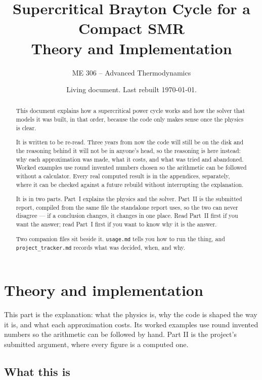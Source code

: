 \documentclass[11pt,a4paper]{report}
\title{\vspace{-1.5cm}\Large\bfseries
  Supercritical \ce{CO2} Brayton Cycle for a Compact SMR\\[2mm]
  \large Theory and Implementation}
\author{\normalsize ME 306 -- Advanced Thermodynamics}
\date{\normalsize Living document. Last rebuilt \today.}
\newcommand{\code}[1]{\texttt{\small #1}}
\begin{document}
\maketitle

\begin{abstract}
\noindent
This document explains how a supercritical  power cycle works and
how the solver that models it was built, in that order, because the code
only makes sense once the physics is clear.

It is written to be re-read. Three years from now the code will still be on
the disk and the reasoning behind it will not be in anyone's head, so the
reasoning is here instead: why each approximation was made, what it costs,
and what was tried and abandoned. Worked examples use round invented numbers
chosen so the arithmetic can be followed without a calculator. Every real
computed result is in the appendices, separately, where it can be checked
against a future rebuild without interrupting the explanation.

It is in two parts. Part~I explains the physics and the solver. Part~II
is the submitted report, compiled from the same file the standalone report
uses, so the two can never disagree --- if a conclusion changes, it changes
in one place. Read Part~II first if you want the answer; read Part~I first
if you want to know why it is the answer.

Two companion files sit beside it. \code{usage.md} tells you how to
run the thing, and \code{project\_\allowbreak tracker.md} records what was
decided, when, and why.
\end{abstract}

\tableofcontents

\part{Theory and implementation}

This part is the explanation: what the physics is, why the code is shaped
the way it is, and what each approximation costs. Its worked examples use
round invented numbers so the arithmetic can be followed by hand. Part II
is the project's submitted argument, where every figure is a computed one.

\chapter{What this is}
\end{document}
